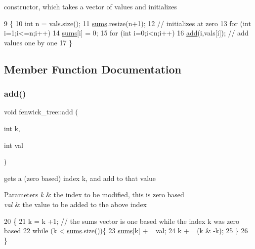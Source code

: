 constructor, which takes a vector of values and initializes 


\begin{DoxyCode}
9 \{
10   \textcolor{keywordtype}{int} n = vals.size();
11   \hyperlink{classfenwick__tree_ac05c8fc17f358a38a2bab242f9164138}{sums}.resize(n+1);
12   \textcolor{comment}{// initializes at zero}
13   \textcolor{keywordflow}{for} (\textcolor{keywordtype}{int} i=1;i<=n;i++)
14     \hyperlink{classfenwick__tree_ac05c8fc17f358a38a2bab242f9164138}{sums}[i] = 0;
15   \textcolor{keywordflow}{for} (\textcolor{keywordtype}{int} i=0;i<n;i++)
16     \hyperlink{classfenwick__tree_ab2f999bba718bcd57d066db754d85ad4}{add}(i,vals[i]); \textcolor{comment}{// add values one by one}
17 \}
\end{DoxyCode}


\subsection{Member Function Documentation}
\mbox{\label{classfenwick__tree_ab2f999bba718bcd57d066db754d85ad4}} 
\subsubsection{\texorpdfstring{add()}{add()}}
{\footnotesize\ttfamily void fenwick\+\_\+tree\+::add (\begin{DoxyParamCaption}\item[{int}]{k,  }\item[{int}]{val }\end{DoxyParamCaption})}

gets a (zero based) index k, and add to that value 
\begin{DoxyParams}{Parameters}
{\em k} & the index to be modified, this is zero based \\
\hline
{\em val} & the value to be added to the above index \\
\hline
\end{DoxyParams}

\begin{DoxyCode}
20 \{
21   k = k +1; \textcolor{comment}{// the sums vector is one based while the index k was zero based}
22   \textcolor{keywordflow}{while} (k < \hyperlink{classfenwick__tree_ac05c8fc17f358a38a2bab242f9164138}{sums}.size())\{
23     \hyperlink{classfenwick__tree_ac05c8fc17f358a38a2bab242f9164138}{sums}[k] += val;
24     k += (k & -k);
25   \}
26 \}
\end{DoxyCode}
\mbox{\label{classfenwick__tree_abedd21a2ddbbb830195c8eba1330112f}} 
